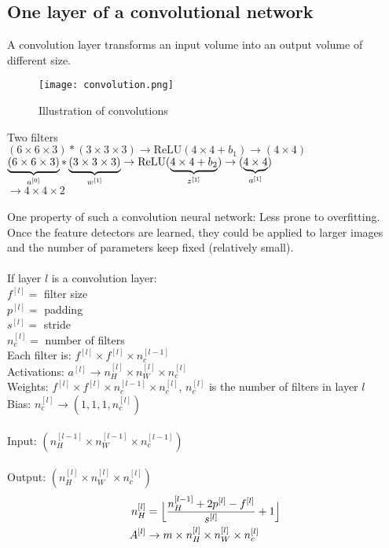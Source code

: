 %
\subsection{One layer of a convolutional network}
A convolution layer transforms an input volume into an output volume of different size.\\
\begin{figure}[h]
    \centering
    \texttt{[image: convolution.png]}
    \caption{Illustration of convolutions}
    \label{fig:convolution}
\end{figure}
Two filters\\
$(6 \times 6 \times 3) * (3 \times 3 \times 3) \rightarrow \text{ReLU}(4 \times 4 + b_1) \rightarrow (4 \times 4)$\\
$\underbrace{(6 \times 6 \times 3)}_{\normalfont a^{[0]}} * \underbrace{(3 \times 3 \times 3)}_{\normalfont w^{[1]}} \rightarrow \text{ReLU}(\underbrace{4 \times 4 + b_2}_{\normalfont z^{[1]}}) \rightarrow (\underbrace{4 \times 4}_{\normalfont a^{[1]}})$\\
$\rightarrow 4 \times 4 \times 2$\\
\\
One property of such a convolution neural network: Less prone to overfitting. Once the feature detectors are learned, they could be applied to larger images and the number of parameters keep fixed (relatively small).\\
\\
If layer $l$ is a convolution layer:\\
$f^{[l]} = $ filter size\\
$p^{[l]} = $ padding\\
$s^{[l]} = $ stride\\
$n_c^{[l]} = $ number of filters\\
Each filter is: $f^{[l]} \times f^{[l]} \times n_c^{[l-1]}$\\
Activations: $a^{[l]} \rightarrow n_H^{[l]} \times n_W^{[l]} \times n_c^{[l]}$\\
Weights: $f^{[l]} \times f^{[l]} \times n_c^{[l-1]} \times n_c^{[l]}$, $n_c^{[l]} $ is the number of filters in layer $l$\\
Bias: $n_c^{[l]} \rightarrow (1,1,1, n_c^{[l]})$\\\\
Input: $(n_H^{[l-1]} \times n_W^{[l-1]} \times n_c^{[l-1]})$\\\\
Output: $(n_H^{[l]} \times n_W^{[l]} \times n_c^{[l]})$\\
\begin{align*}
n_H^{[l]} &= \Bigl \lfloor \frac{n_H^{[l-1]} +2p^{[l]}-f^{[l]}}{s^{[l]}} +1 \Bigr \rfloor\\
A^{[l]} &\rightarrow m \times n_H^{[l]} \times n_W^{[l]} \times n_c^{[l]}
\end{align*}

